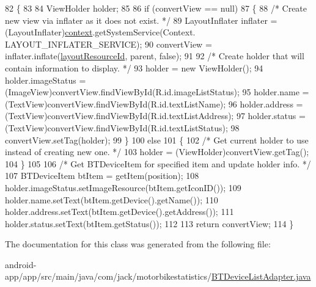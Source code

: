 \begin{DoxyCode}
82                                                                           \{
83 
84         ViewHolder holder;
85 
86         \textcolor{keywordflow}{if} (convertView == null)
87         \{
88             \textcolor{comment}{/* Create new view via inflater as it does not exist. */}
89             LayoutInflater inflater = (LayoutInflater)\hyperlink{classcom_1_1jack_1_1motorbikestatistics_1_1_b_t_device_list_adapter_a6e42efbb29008651704bef82263ae838}{context}.getSystemService(Context.
      LAYOUT\_INFLATER\_SERVICE);
90             convertView = inflater.inflate(\hyperlink{classcom_1_1jack_1_1motorbikestatistics_1_1_b_t_device_list_adapter_a3f7a9f653fb6a0fcda0a0a61e29d0f06}{layoutResourceId}, parent, \textcolor{keyword}{false});
91 
92             \textcolor{comment}{/* Create holder that will contain information to display. */}
93             holder = \textcolor{keyword}{new} ViewHolder();
94             holder.imageStatus = (ImageView)convertView.findViewById(R.id.imageListStatus);
95             holder.name = (TextView)convertView.findViewById(R.id.textListName);
96             holder.address = (TextView)convertView.findViewById(R.id.textListAddress);
97             holder.status = (TextView)convertView.findViewById(R.id.textListStatus);
98             convertView.setTag(holder);
99         \}
100         \textcolor{keywordflow}{else}
101         \{
102             \textcolor{comment}{/* Get current holder to use instead of creating new one. */}
103             holder = (ViewHolder)convertView.getTag();
104         \}
105 
106         \textcolor{comment}{/* Get BTDeviceItem for specified item and update holder info. */}
107         BTDeviceItem btItem = getItem(position);
108         holder.imageStatus.setImageResource(btItem.getIconID());
109         holder.name.setText(btItem.getDevice().getName());
110         holder.address.setText(btItem.getDevice().getAddress());
111         holder.status.setText(btItem.getStatus());
112 
113         \textcolor{keywordflow}{return} convertView;
114     \}
\end{DoxyCode}


The documentation for this class was generated from the following file\+:\begin{DoxyCompactItemize}
\item 
android-\/app/app/src/main/java/com/jack/motorbikestatistics/\hyperlink{_b_t_device_list_adapter_8java}{B\+T\+Device\+List\+Adapter.\+java}\end{DoxyCompactItemize}
